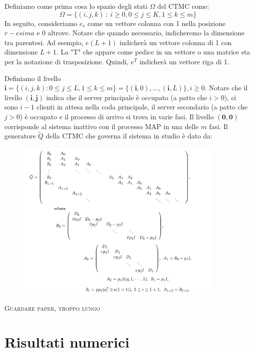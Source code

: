 \documentclass[11pt]{article}
\begin{document}
\noindent Definiamo come prima cosa lo spazio degli stati $\Omega$ del CTMC come:
\begin{equation}
    \Omega = \{ (i,j,k) ~ : ~ i \geq 0, 0 \leq j \leq K, 1 \leq k \leq m \}
\end{equation}
In seguito, consideriamo $e_r$ come un vettore colonna con 1 nella posizione $r-esima$ e 0 altrove. Notare che quando necessario, indicheremo la dimensione tra parentesi. Ad esempio, $e(L + 1)$ indicherà un vettore colonna di 1 con dimensione $L+1$. La "T" che appare come pedice in un vettore o una matrice sta per la notazione di trasposizione. Quindi, $e^T$ indicherà un vettore riga di 1. \vspace*{0.4cm}

\noindent Definiamo il livello $\textbf{i} = \{(i, j, k) : 0 \leq j \leq L, 1 \leq k \leq m\} = \{(\textbf{i}, 0), \dots, (\textbf{i}, L)\}, i \geq 0$. Notare che il livello $(\textbf{i},\textbf{j})$ indica che il server principale è occupato (a patto che $i>0$), ci sono $i-1$ clienti in attesa nella coda principale, il server secondario (a patto che $j>0$) è occupato e il processo di arrivo si trova in varie fasi. Il livello $(\textbf{0},\textbf{0})$ corrisponde al sistema inattivo con il processo MAP in una delle $m$ fasi. Il generatore $\widetilde{Q}$ della CTMC che governa il sistema in studio è dato da:
\begin{figure}[h!]
    \centering
    \includegraphics[width=0.9\textwidth]{FcngTm3.png}
    \label{fig:GI-M-1}
\end{figure}

\textsc{Guardare paper, troppo lungo}

\section{Risultati numerici}
\end{document}
